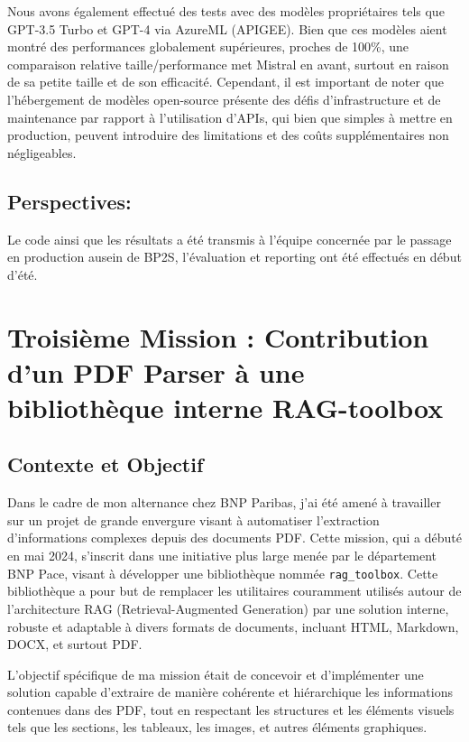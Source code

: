 \documentclass[13pt,a4paper]{article}
\begin{document}
Nous avons également effectué des tests avec des modèles propriétaires tels que GPT-3.5 Turbo et GPT-4 via AzureML (APIGEE). Bien que ces modèles aient montré des performances globalement supérieures, proches de 100\%, une comparaison relative taille/performance met Mistral en avant, surtout en raison de sa petite taille et de son efficacité. Cependant, il est important de noter que l'hébergement de modèles open-source présente des défis d'infrastructure et de maintenance par rapport à l'utilisation d'APIs, qui bien que simples à mettre en production, peuvent introduire des limitations et des coûts supplémentaires non négligeables.

\subsection{Perspectives:}
Le code ainsi que les résultats a été transmis à l'équipe concernée par le passage en production ausein de BP2S, l'évaluation et reporting ont été effectués en début d'été.
\newpage

\section{ \Large \bf Troisième Mission : Contribution d'un PDF Parser à une bibliothèque interne RAG-toolbox}

\subsection{Contexte et Objectif}

Dans le cadre de mon alternance chez BNP Paribas, j'ai été amené à travailler sur un projet de grande envergure visant à automatiser l'extraction d'informations complexes depuis des documents PDF. Cette mission, qui a débuté en mai 2024, s'inscrit dans une initiative plus large menée par le département BNP Pace, visant à développer une bibliothèque nommée \texttt{rag\_toolbox}. Cette bibliothèque a pour but de remplacer les utilitaires couramment utilisés autour de l'architecture RAG (Retrieval-Augmented Generation) par une solution interne, robuste et adaptable à divers formats de documents, incluant HTML, Markdown, DOCX, et surtout PDF.

L'objectif spécifique de ma mission était de concevoir et d'implémenter une solution capable d'extraire de manière cohérente et hiérarchique les informations contenues dans des PDF, tout en respectant les structures et les éléments visuels tels que les sections, les tableaux, les images, et autres éléments graphiques.
\end{document}
